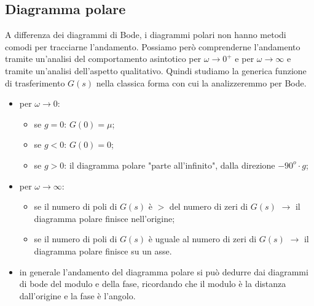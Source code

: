 \begin{landscape}
    \subsection*{Diagramma polare}
    A differenza dei diagrammi di Bode, i diagrammi polari non hanno metodi comodi per tracciarne l'andamento. Possiamo però comprenderne l'andamento tramite un'analisi del comportamento asintotico per $\omega \rightarrow 0^+$ e per $\omega \rightarrow  \infty$ e tramite un'analisi dell'aspetto qualitativo.\newline
    \newline
    Quindi studiamo la generica funzione di trasferimento $G(s)$ nella classica forma con cui la analizzeremmo per Bode.
    \begin{itemize}
        \item per $\omega \rightarrow  0$:
        \begin{itemize}
            \item se $g=0$: $G(0) = \mu$;
            \item se $g<0$: $G(0) = 0$;
            \item se $g>0$: il diagramma polare "parte all'infinito", dalla direzione $-90^o \cdot  g$;
        \end{itemize}
        \item per $\omega \rightarrow  \infty$:
        \begin{itemize}
            \item se il numero di poli di $G(s)$ è $>$ del numero di zeri di $G(s)$ $\rightarrow $ il diagramma polare finisce nell'origine;
            \item se il numero di poli di $G(s)$ è uguale al numero di zeri di $G(s)$ $\rightarrow $ il diagramma polare finisce su un asse.
        \end{itemize}
        \item in generale l'andamento del diagramma polare si può dedurre dai diagrammi di bode del modulo e della fase, ricordando che il modulo è la distanza dall'origine e la fase è l'angolo.
    \end{itemize}

\end{landscape}
